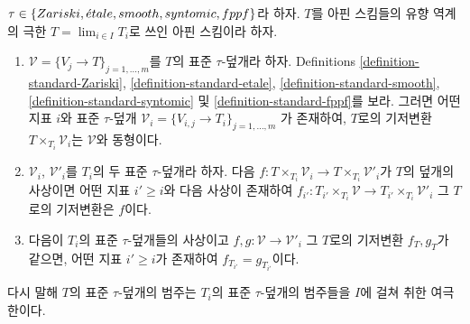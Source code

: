 \begin{lemma}
\label{lemma-limit-fppf-topology}
$\tau \in \{Zariski, {\acute{e}tale}, smooth, syntomic, fppf\}$라 하자. $T$를 아핀
스킴들의 유향 역계의 극한 $T = \lim_{i \in I} T_i$로 쓰인 아핀 스킴이라
하자.
\begin{enumerate}
\item $\mathcal{V} = \{V_j \to T\}_{j = 1, \ldots, m}$를 $T$의 표준
$\tau$-덮개라 하자. Definitions
\ref{definition-standard-Zariski},
\ref{definition-standard-etale},
\ref{definition-standard-smooth},
\ref{definition-standard-syntomic} 및
\ref{definition-standard-fppf}를 보라. 그러면 어떤 지표 $i$와 표준
$\tau$-덮개
$\mathcal{V}_i = \{V_{i, j} \to T_i\}_{j = 1, \ldots, m}$
가 존재하여, $T$로의 기저변환 $T \times_{T_i} \mathcal{V}_i$는
$\mathcal{V}$와 동형이다.
\item $\mathcal{V}_i$, $\mathcal{V}'_i$를 $T_i$의 두 표준 $\tau$-덮개라
하자. 다음
$f : T \times_{T_i} \mathcal{V}_i \to T \times_{T_i} \mathcal{V}'_i$가
$T$의 덮개의 사상이면
어떤 지표 $i' \geq i$와 다음 사상이 존재하여
$f_{i'} : T_{i'} \times_{T_i} \mathcal{V} \to
T_{i'} \times_{T_i} \mathcal{V}'_i$
그 $T$로의 기저변환은 $f$이다.
\item 다음이 $T_i$의 표준 $\tau$-덮개들의 사상이고
$f, g : \mathcal{V} \to \mathcal{V}'_i$
그 $T$로의 기저변환 $f_T, g_T$가 같으면, 어떤 지표 $i' \geq i$가
존재하여 $f_{T_{i'}} = g_{T_{i'}}$이다.
\end{enumerate}
다시 말해 $T$의 표준 $\tau$-덮개의 범주는 $T_i$의 표준 $\tau$-덮개의
범주들을 $I$에 걸쳐 취한 여극한이다.
\end{lemma}

